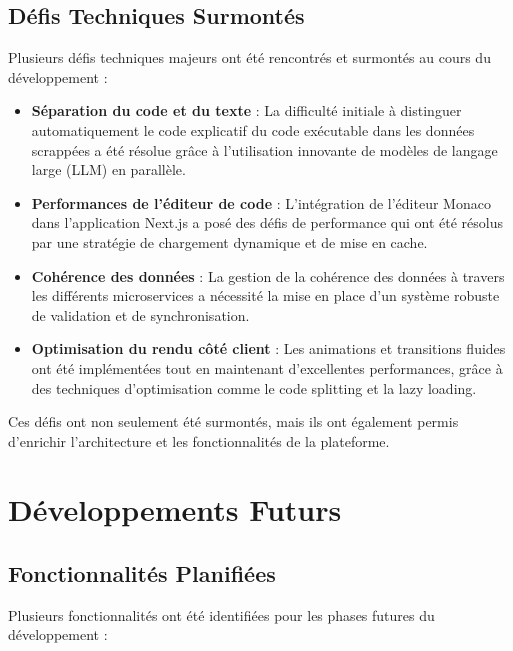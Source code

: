 \subsection{Défis Techniques Surmontés}
Plusieurs défis techniques majeurs ont été rencontrés et surmontés au cours du développement :

\begin{itemize}
  \item \textbf{Séparation du code et du texte} : La difficulté initiale à distinguer automatiquement le code explicatif du code exécutable dans les données scrappées a été résolue grâce à l'utilisation innovante de modèles de langage large (LLM) en parallèle.
  
  \item \textbf{Performances de l'éditeur de code} : L'intégration de l'éditeur Monaco dans l'application Next.js a posé des défis de performance qui ont été résolus par une stratégie de chargement dynamique et de mise en cache.
  
  \item \textbf{Cohérence des données} : La gestion de la cohérence des données à travers les différents microservices a nécessité la mise en place d'un système robuste de validation et de synchronisation.
  
  \item \textbf{Optimisation du rendu côté client} : Les animations et transitions fluides ont été implémentées tout en maintenant d'excellentes performances, grâce à des techniques d'optimisation comme le code splitting et la lazy loading.
\end{itemize}

Ces défis ont non seulement été surmontés, mais ils ont également permis d'enrichir l'architecture et les fonctionnalités de la plateforme.

\section{Développements Futurs}

\subsection{Fonctionnalités Planifiées}
Plusieurs fonctionnalités ont été identifiées pour les phases futures du développement :

